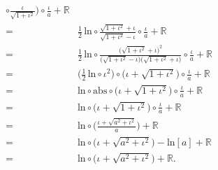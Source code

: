 \begin{example}
\begin{align*}
        \circ \frac{\iota}{\sqrt{1 + \iota^2}} \Bigg) \circ \frac{\iota}{a}
        + \mathbb{R}                                                            \\
        = {} & \frac{1}{2}\,\mathrm{ln} \circ \frac{\sqrt{1 + \iota^2} + \iota}
        {\sqrt{1 + \iota^2} - \iota} \circ \frac{\iota}{a} + \mathbb{R}         \\
        = {} & \frac{1}{2}\,\mathrm{ln} \circ \frac{\big( \sqrt{1 + \iota^2}
            + \iota \big)^2}
        {\big( \sqrt{1 + \iota^2} - \iota \big)
            \big( \sqrt{1 + \iota^2} + \iota \big)}
        \circ \frac{\iota}{a} + \mathbb{R}                                      \\
        = {} & \bigg( \frac{1}{2}\,\mathrm{ln} \circ \iota^2 \bigg) \circ
        \big( \iota + \sqrt{1 + \iota^2} \big) \circ \frac{\iota}{a}
        + \mathbb{R}                                                            \\
        = {} & \mathrm{ln} \circ \mathrm{abs} \circ
        \big( \iota + \sqrt{1 + \iota^2} \big) \circ \frac{\iota}{a}
        + \mathbb{R}                                                            \\
        = {} & \mathrm{ln} \circ \big( \iota + \sqrt{1 + \iota^2} \big)
        \circ \frac{\iota}{a} + \mathbb{R}                                      \\
        = {} & \mathrm{ln} \circ \Bigg( \frac{\iota + \sqrt{a^2 + \iota^2}}{a}
        \Bigg) + \mathbb{R}                                                     \\
        = {} & \mathrm{ln} \circ \big( \iota + \sqrt{a^2 + \iota^2}
        \big) - \mathrm{ln} [a] + \mathbb{R}                                    \\
        = {} & \mathrm{ln} \circ \big( \iota + \sqrt{a^2 + \iota^2}
        \big) + \mathbb{R}.
    \end{align*}
\end{example}


